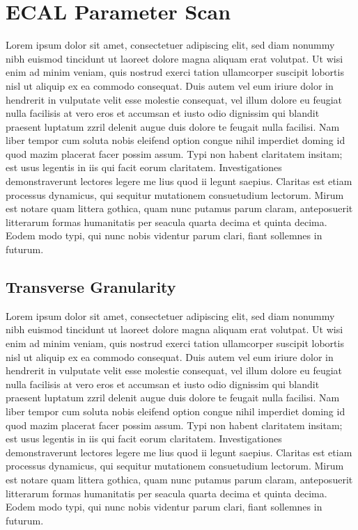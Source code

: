 \documentclass[final,3p,times,twocolumn]{elsarticle}
\begin{document}
\section{ECAL Parameter Scan}
Lorem ipsum dolor sit amet, consectetuer adipiscing elit, sed diam nonummy nibh euismod tincidunt ut laoreet dolore magna aliquam erat volutpat. Ut wisi enim ad minim veniam, quis
nostrud exerci tation ullamcorper suscipit lobortis nisl ut aliquip ex ea commodo consequat. Duis autem vel eum iriure dolor in hendrerit in vulputate velit esse molestie consequat,
vel illum dolore eu feugiat nulla facilisis at vero eros et accumsan et iusto odio dignissim qui blandit praesent luptatum zzril delenit augue duis dolore te feugait nulla facilisi.
Nam liber tempor cum soluta nobis eleifend option congue nihil imperdiet doming id quod mazim placerat facer possim assum. Typi non habent claritatem insitam; est usus legentis in
iis qui facit eorum claritatem. Investigationes demonstraverunt lectores legere me lius quod ii legunt saepius. Claritas est etiam processus dynamicus, qui sequitur mutationem
consuetudium lectorum. Mirum est notare quam littera gothica, quam nunc putamus parum claram, anteposuerit litterarum formas humanitatis per seacula quarta decima et quinta
decima. Eodem modo typi, qui nunc nobis videntur parum clari, fiant sollemnes in futurum.

\subsection{Transverse Granularity}
Lorem ipsum dolor sit amet, consectetuer adipiscing elit, sed diam nonummy nibh euismod tincidunt ut laoreet dolore magna aliquam erat volutpat. Ut wisi enim ad minim veniam, quis
nostrud exerci tation ullamcorper suscipit lobortis nisl ut aliquip ex ea commodo consequat. Duis autem vel eum iriure dolor in hendrerit in vulputate velit esse molestie consequat,
vel illum dolore eu feugiat nulla facilisis at vero eros et accumsan et iusto odio dignissim qui blandit praesent luptatum zzril delenit augue duis dolore te feugait nulla facilisi.
Nam liber tempor cum soluta nobis eleifend option congue nihil imperdiet doming id quod mazim placerat facer possim assum. Typi non habent claritatem insitam; est usus legentis in
iis qui facit eorum claritatem. Investigationes demonstraverunt lectores legere me lius quod ii legunt saepius. Claritas est etiam processus dynamicus, qui sequitur mutationem
consuetudium lectorum. Mirum est notare quam littera gothica, quam nunc putamus parum claram, anteposuerit litterarum formas humanitatis per seacula quarta decima et quinta
decima. Eodem modo typi, qui nunc nobis videntur parum clari, fiant sollemnes in futurum.
\end{document}
